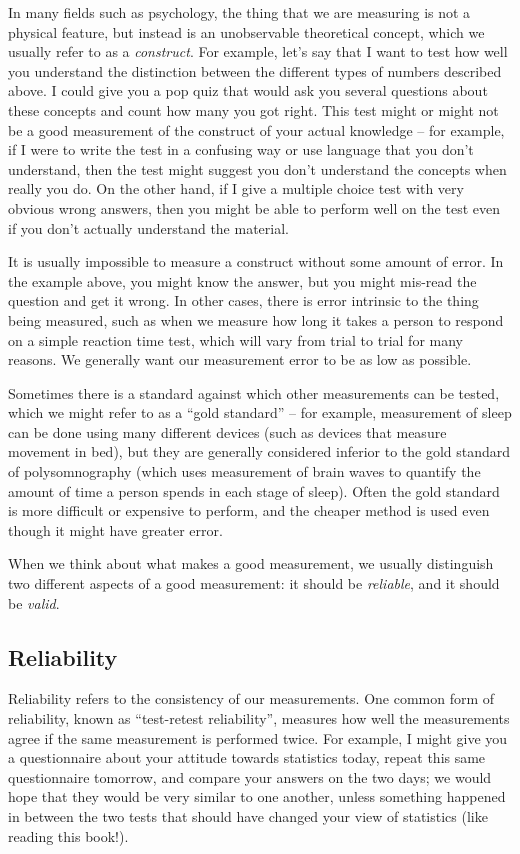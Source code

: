 \documentclass[12pt,]{book}
\theoremstyle{definition}
\theoremstyle{definition}
\theoremstyle{definition}
\theoremstyle{remark}
\begin{document}
In many fields such as psychology, the thing that we are measuring is not a physical feature, but instead is an unobservable theoretical concept, which we usually refer to as a \emph{construct}. For example, let's say that I want to test how well you understand the distinction between the different types of numbers described above. I could give you a pop quiz that would ask you several questions about these concepts and count how many you got right. This test might or might not be a good measurement of the construct of your actual knowledge -- for example, if I were to write the test in a confusing way or use language that you don't understand, then the test might suggest you don't understand the concepts when really you do. On the other hand, if I give a multiple choice test with very obvious wrong answers, then you might be able to perform well on the test even if you don't actually understand the material.

It is usually impossible to measure a construct without some amount of error. In the example above, you might know the answer, but you might mis-read the question and get it wrong. In other cases, there is error intrinsic to the thing being measured, such as when we measure how long it takes a person to respond on a simple reaction time test, which will vary from trial to trial for many reasons. We generally want our measurement error to be as low as possible.

Sometimes there is a standard against which other measurements can be tested, which we might refer to as a ``gold standard'' -- for example, measurement of sleep can be done using many different devices (such as devices that measure movement in bed), but they are generally considered inferior to the gold standard of polysomnography (which uses measurement of brain waves to quantify the amount of time a person spends in each stage of sleep). Often the gold standard is more difficult or expensive to perform, and the cheaper method is used even though it might have greater error.

When we think about what makes a good measurement, we usually distinguish two different aspects of a good measurement: it should be \emph{reliable}, and it should be \emph{valid}.

\hypertarget{reliability}{%
\subsection{Reliability}\label{reliability}}

Reliability refers to the consistency of our measurements. One common form of reliability, known as ``test-retest reliability'', measures how well the measurements agree if the same measurement is performed twice. For example, I might give you a questionnaire about your attitude towards statistics today, repeat this same questionnaire tomorrow, and compare your answers on the two days; we would hope that they would be very similar to one another, unless something happened in between the two tests that should have changed your view of statistics (like reading this book!).
\end{document}
